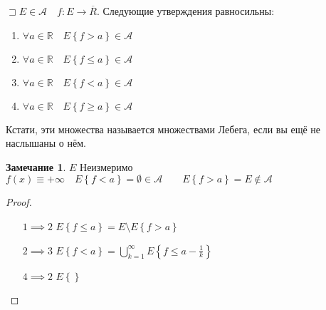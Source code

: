 \documentclass{book}
\newcommand\R{\ensuremath{\mathbb{R}}}
\renewcommand\O{\ensuremath{\emptyset}}
\theoremstyle{definition}
\newtheorem*{note}{Замечание}
\begin{document}
\begin{statement}
    $\sqsupset E\in \mathcal A\quad f: E \to \overline R$. Следующие утверждения равносильны:
    \begin{enumerate}
        \item $\forall a\in \R\quad E\left\{ f > a \right\} \in \mathcal A$
        \item $\forall a\in \R\quad E\left\{ f \leqslant  a \right\} \in \mathcal A$
        \item $\forall a\in \R\quad E\left\{ f < a \right\} \in \mathcal A$
        \item $\forall a\in \R\quad E\left\{ f \geqslant  a \right\} \in \mathcal A$
    \end{enumerate}

    Кстати, эти множества называется множествами Лебега, если вы ещё не наслышаны о нём.
\end{statement}
\begin{note}
    $E$ Неизмеримо  $f(x) \equiv +\infty \quad E\left\{ f<a \right\}  = \O \in \mathcal A\qquad E\left\{ f>a \right\}  = E\not\in \mathcal A$
\end{note}
\begin{proof}
    \begin{itemize}
        \item []
        \item [$1\implies 2$] $E\left\{ f\leqslant a \right\}  = E \setminus E\left\{ f>a \right\} $
        \item [$2\implies 3$] $E\left\{ f<a \right\} = \bigcup\limits_{k=1}^{\infty }E\left\{ f\leqslant a - \frac{1}{k} \right\}  $ 
        \item [$4\implies 2$] $E\left\{  \right\} $
    \end{itemize}
\end{proof}




























 
\end{document}
